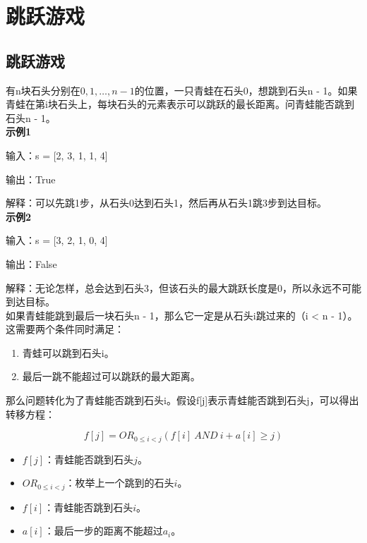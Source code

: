 \section{跳跃游戏}

\subsection{跳跃游戏}

有n块石头分别在$ 0, 1, \dots, n-1 $的位置，一只青蛙在石头0，想跳到石头n - 1。如果青蛙在第i块石头上，每块石头的元素表示可以跳跃的最长距离。问青蛙能否跳到石头n - 1。\\

\textbf{示例1}

输入：s = [2, 3, 1, 1, 4]

输出：True

解释：可以先跳1步，从石头0达到石头1，然后再从石头1跳3步到达目标。\\

\textbf{示例2}

输入：s = [3, 2, 1, 0, 4]

输出：False

解释：无论怎样，总会达到石头3，但该石头的最大跳跃长度是0，所以永远不可能到达目标。\\

如果青蛙能跳到最后一块石头n - 1，那么它一定是从石头i跳过来的（i < n - 1）。\\

这需要两个条件同时满足：

\begin{enumerate}
	\item 青蛙可以跳到石头i。
	\item 最后一跳不能超过可以跳跃的最大距离。
\end{enumerate}

那么问题转化为了青蛙能否跳到石头i。假设f[j]表示青蛙能否跳到石头j，可以得出转移方程：

\vspace{-0.5cm}

$$
	f[j] = OR_{0 \le i < j}(f[i]\ AND\ i + a[i] \ge j)
$$

\begin{itemize}
	\item $ f[j] $：青蛙能否跳到石头$ j $。

	\item $ OR_{0 \le i < j} $：枚举上一个跳到的石头$ i $。

	\item $ f[i] $：青蛙能否跳到石头$ i $。

	\item $ a[i] $：最后一步的距离不能超过$ a_i $。
\end{itemize}


